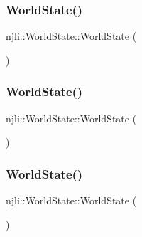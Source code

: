 \subsubsection{\texorpdfstring{World\+State()}{WorldState()}\hspace{0.1cm}{\footnotesize\ttfamily [1/3]}}
{\footnotesize\ttfamily njli\+::\+World\+State\+::\+World\+State (\begin{DoxyParamCaption}{ }\end{DoxyParamCaption})\hspace{0.3cm}{\ttfamily [protected]}}

\mbox{\label{classnjli_1_1_world_state_afc6c9395d05e594f76653bbeb2f7071b}} 
\subsubsection{\texorpdfstring{World\+State()}{WorldState()}\hspace{0.1cm}{\footnotesize\ttfamily [2/3]}}
{\footnotesize\ttfamily njli\+::\+World\+State\+::\+World\+State (\begin{DoxyParamCaption}\item[{const \mbox{\hyperlink{classnjli_1_1_abstract_builder}{Abstract\+Builder}} \&}]{ }\end{DoxyParamCaption})\hspace{0.3cm}{\ttfamily [protected]}}

\mbox{\label{classnjli_1_1_world_state_a25d2acb92950ac2f0e2aa0a1db1ead88}} 
\subsubsection{\texorpdfstring{World\+State()}{WorldState()}\hspace{0.1cm}{\footnotesize\ttfamily [3/3]}}
{\footnotesize\ttfamily njli\+::\+World\+State\+::\+World\+State (\begin{DoxyParamCaption}\item[{const \mbox{\hyperlink{classnjli_1_1_world_state}{World\+State}} \&}]{ }\end{DoxyParamCaption})\hspace{0.3cm}{\ttfamily [protected]}}

